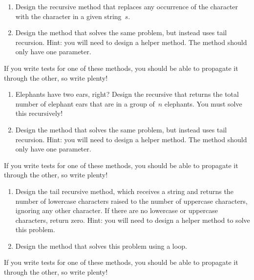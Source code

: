 \begin{enumerate}[label=(\alph*)]
    \item Design the recursive  method that replaces any occurrence of the character  with the character  in a given string~$s$.
    \item Design the  method that solves the same problem, but instead uses tail recursion. Hint: you will need to design a  helper method. The  method should only have one parameter.
\end{enumerate}
If you write tests for one of these methods, you should be able to propagate it through the other, so write plenty!

\begin{enumerate}[label=(\alph*)]
    \item Elephants have two ears, right? Design the recursive  that returns the total number of elephant ears that are in a group of~$n$ elephants. You must solve this recursively!
    \item Design the  method that solves the same problem, but instead uses tail recursion. Hint: you will need to design a  helper method. The  method should only have one parameter.
\end{enumerate}
If you write tests for one of these methods, you should be able to propagate it through the other, so write plenty!

\begin{enumerate}[label=(\alph*)]
    \item Design the  tail recursive method, which receives a string and returns the number of lowercase characters raised to the number of uppercase characters, ignoring any other character. If there are no lowercase or uppercase characters, return zero. Hint: you will need to design a  helper method to solve this problem.
    \item Design the  method that solves this problem using a loop.
\end{enumerate}
If you write tests for one of these methods, you should be able to propagate it through the other, so write plenty!

